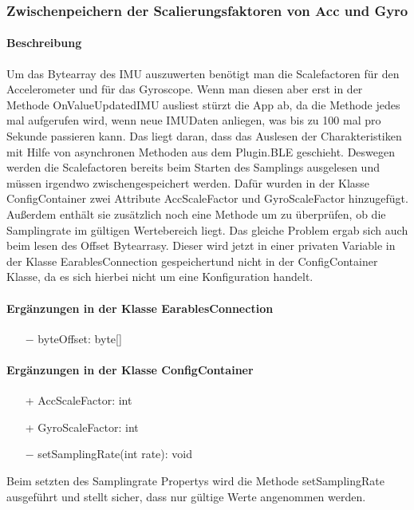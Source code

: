 \documentclass[a4paper,12pt]{article}
\begin{document}
\subsubsection{Zwischenpeichern der Scalierungsfaktoren von Acc und Gyro}
\paragraph{Beschreibung}
Um das Bytearray des IMU auszuwerten benötigt man die Scalefactoren für den Accelerometer und für das Gyroscope. Wenn man diesen aber erst in der Methode OnValueUpdatedIMU ausliest stürzt die App ab, da die Methode jedes mal aufgerufen wird, wenn neue IMUDaten anliegen, was bis zu 100 mal pro Sekunde passieren kann. Das liegt daran, dass das Auslesen der Charakteristiken mit Hilfe von asynchronen Methoden aus dem Plugin.BLE geschieht. Deswegen werden die Scalefactoren bereits beim Starten des Samplings ausgelesen und müssen irgendwo zwischengespeichert werden. Dafür wurden in der Klasse ConfigContainer zwei Attribute AccScaleFactor und GyroScaleFactor hinzugefügt. Außerdem enthält sie zusätzlich noch eine Methode um zu überprüfen, ob die Samplingrate im gültigen Wertebereich liegt. Das gleiche Problem ergab sich auch beim lesen des Offset Bytearrasy. Dieser wird jetzt in einer privaten Variable in der Klasse EarablesConnection gespeichertund nicht in der ConfigContainer Klasse, da es sich hierbei nicht um eine Konfiguration handelt.

\paragraph{Ergänzungen in der Klasse EarablesConnection}
\begin{itemize}
	\item[$-$] byteOffset: byte[]
\end{itemize}

\paragraph{Ergänzungen in der Klasse ConfigContainer}
\begin{itemize}
	\item[+] AccScaleFactor: int 
	\item[+] GyroScaleFactor: int
	\item[$-$]  setSamplingRate(int rate): void 
\end{itemize}
Beim setzten des Samplingrate Propertys wird die Methode setSamplingRate ausgeführt und stellt sicher, dass nur gültige Werte angenommen werden.
\end{document}

